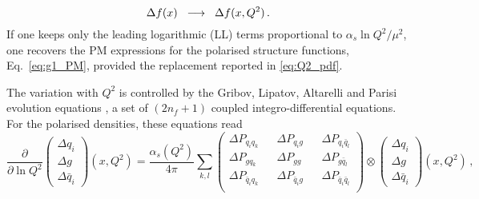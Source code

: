 \begin{equation}
  \Delta f(x)  \hspace{2mm} \longrightarrow \hspace{2mm} \Delta f(x,Q^2) \,.
  \label{eq:Q2_pdf}
\end{equation}
If one keeps only the leading logarithmic (LL) terms proportional to $\alpha_{s} \ln Q^2/\mu^2$, one recovers the PM expressions for the polarised structure functions, Eq.~\eqref{eq:g1_PM}, provided the replacement reported in \eqref{eq:Q2_pdf}.\par
The variation with $Q^2$ is controlled by the Gribov, Lipatov, Altarelli and Parisi evolution equations \cite{Altarelli:1977zs}, a set of $(2 n_f + 1)$ coupled integro-differential equations. For the polarised densities, these equations read
\begin{equation}
  \frac{\partial}{\partial \ln Q^2} 
  \left(\begin{matrix}
    \Delta q_i \\
    \Delta g \\
    \Delta \bar{q}_i
  \end{matrix} \right) (x,Q^2) = \frac{\alpha_{s}(Q^2)}{4 \pi}  \sum_{k,l}
  \left(\begin{matrix}
    \Delta P_{q_i q_k} && \Delta P_{q_i g} && \Delta P_{q_i \bar{q}_l} \\
    \Delta P_{g q_k} && \Delta P_{g g} && \Delta P_{g \bar{q}_l} \\
    \Delta P_{\bar{q}_i q_k} && \Delta P_{\bar{q}_i g} && \Delta P_{\bar{q}_i \bar{q}_l} \\
  \end{matrix}\right) \otimes 
  \left(\begin{matrix}
    \Delta q_i \\
    \Delta g \\
    \Delta \bar{q}_i
  \end{matrix} \right) (x,Q^2) \,,
  \label{eq:DGLAP_coupled}
\end{equation}
